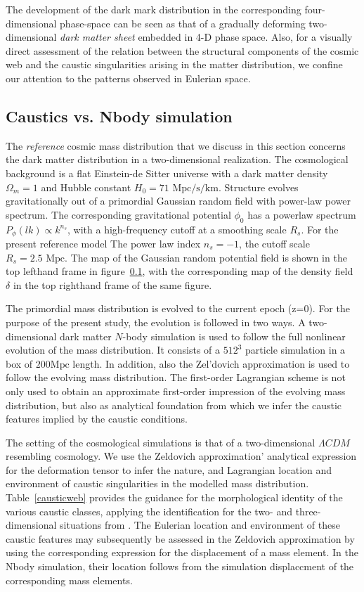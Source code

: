 \documentclass[a4paper, 11pt]{article}
\begin{document}
The development of the dark mark distribution in the corresponding
four-dimensional phase-space can be seen as that of a gradually
deforming two-dimensional {\it dark matter sheet} embedded in 4-D phase
space. Also, for a visually direct assessment of the relation between
the structural components of the cosmic web and the caustic
singularities arising in the matter distribution,
we confine our attention to the patterns observed in Eulerian space.

\subsection{Caustics vs. Nbody simulation}
The {\it reference} cosmic mass distribution that we discuss in this
section concerns the dark matter distribution in a two-dimensional
realization. The cosmological background is a flat Einstein-de Sitter
universe with a dark matter density $\Omega_m=1$ and
Hubble constant $H_0=71\text{ Mpc/s/km}$. Structure evolves
gravitationally out of a primordial Gaussian random field with
power-law power spectrum. The corresponding gravitational potential
$\phi_0$ has a powerlaw spectrum $P_{\phi}(lk) \propto k^{n_s}$,
with a high-frequency cutoff at a smoothing scale $R_s$. For the present
reference model The power law index $n_s=-1$, the cutoff scale
$R_s=2.5 \text{ Mpc}$. The map of the Gaussian random potential field is
shown in the top lefthand frame in figure~\ref{}, with the
corresponding map of the density field $\delta$ in the top righthand
frame of the same figure.

The primordial mass distribution is evolved to the current epoch (z=0).
For the purpose of the present study, the evolution is
followed in two ways. A two-dimensional dark matter $N$-body simulation
\cite{Hidding:2020} is
used to follow the full nonlinear evolution of the mass distribution. It
consists of a $512^3$ particle simulation
in a box of $200 \mbox{Mpc}$ length. In addition, also the Zel'dovich
approximation is used to follow the evolving mass
distribution. The first-order Lagrangian scheme is not only used to
obtain an approximate first-order impression of the
evolving mass distribution, but also as analytical foundation from which
we infer the caustic features implied
by the \cite{feldbrugge2019} caustic conditions.

The setting of the cosmological simulations is that of a two-dimensional
$\Lambda CDM$ resembling cosmology. We use the Zeldovich
approximation' analytical expression for the deformation tensor to infer
the nature, and Lagrangian location and environment of
caustic singularities in the modelled mass distribution.
Table~\ref{causticweb} provides the guidance for the morphological
identity of
the various caustic classes, applying the identification for the two-
and three-dimensional situations from \citep[see][]{feldbrugge2019}.
The Eulerian location and environment of these caustic features may
subsequently be assessed
in the Zeldovich approximation by using the corresponding expression for
the displacement of a mass element. In the Nbody simulation,
their location follows from the simulation displaccment of the
corresponding mass elements.
\end{document}
